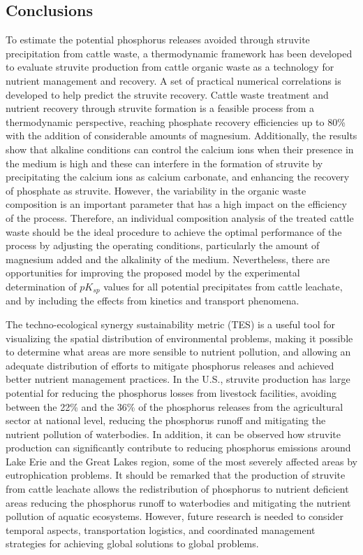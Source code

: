 \begin{refsection}[referencesCh3]
\section{Conclusions}
To estimate the potential phosphorus releases avoided through struvite precipitation from cattle waste, a thermodynamic framework has been developed to evaluate struvite production from cattle organic waste as a technology for nutrient management and recovery. A set of practical numerical correlations is developed to help predict the struvite recovery. Cattle waste treatment and nutrient recovery through struvite formation is a feasible process from a thermodynamic perspective, reaching phosphate recovery efficiencies up to 80\% with the addition of considerable amounts of magnesium. Additionally, the results show that alkaline conditions can control the calcium ions when their presence in the medium is high and these can interfere in the formation of struvite by precipitating the calcium ions as calcium carbonate, and enhancing the recovery of phosphate as struvite. However, the variability in the organic waste composition is an important parameter that has a high impact on the efficiency of the process. Therefore, an individual composition analysis of the treated cattle waste should be the ideal procedure to achieve the optimal performance of the process by adjusting the operating conditions, particularly the amount of magnesium added and the alkalinity of the medium. Nevertheless, there are opportunities for improving the proposed model by the experimental determination of $pK_{sp}$ values for all potential precipitates from cattle leachate, and by including the effects from kinetics and transport phenomena. 

The techno-ecological synergy sustainability metric (TES) is a useful tool for visualizing the spatial distribution of environmental problems, making it possible to determine what areas are  more sensible to nutrient pollution, and allowing an adequate distribution of efforts to mitigate phosphorus releases and achieved better nutrient management practices. In the U.S., struvite production has large potential for reducing the phosphorus losses from livestock facilities, avoiding between the 22\% and the 36\% of the phosphorus releases from the agricultural sector at national level, reducing the phosphorus runoff and mitigating the nutrient pollution of waterbodies. In addition, it can be observed how struvite production can significantly contribute to reducing phosphorus emissions around Lake Erie and the Great Lakes region, some of the most severely affected areas by eutrophication problems. It should be remarked that the production of struvite from cattle leachate allows the redistribution of phosphorus to nutrient deficient areas reducing the phosphorus runoff to waterbodies and mitigating the nutrient pollution of aquatic ecosystems. However, future research is needed to consider temporal aspects, transportation logistics, and coordinated management strategies for achieving global solutions to global problems. 


\end{refsection}
